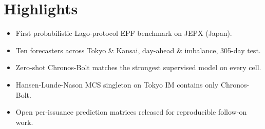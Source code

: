 \documentclass[11pt,a4paper]{article}
\begin{document}
\section*{Highlights}

\begin{itemize}
\item First probabilistic Lago-protocol EPF benchmark on JEPX (Japan).
\item Ten forecasters across Tokyo \& Kansai, day-ahead \& imbalance, 305-day test.
\item Zero-shot Chronos-Bolt matches the strongest supervised model on every cell.
\item Hansen-Lunde-Nason MCS singleton on Tokyo IM contains only Chronos-Bolt.
\item Open per-issuance prediction matrices released for reproducible follow-on work.
\end{itemize}
\end{document}
